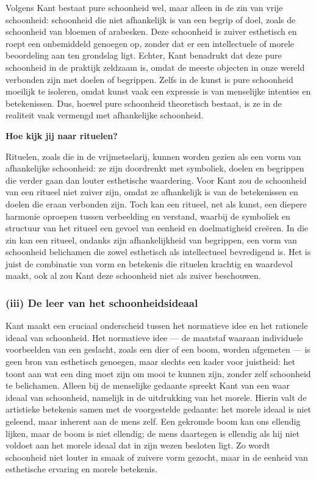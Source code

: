 \documentclass[11pt,twoside,openright]{memoir}
\begin{document}
Volgens Kant bestaat pure schoonheid wel, maar alleen in de zin van vrije schoonheid: schoonheid die niet afhankelijk is van een begrip of doel, zoals de schoonheid van bloemen of arabesken. Deze schoonheid is zuiver esthetisch en roept een onbemiddeld genoegen op, zonder dat er een intellectuele of morele beoordeling aan ten grondslag ligt. Echter, Kant benadrukt dat deze pure schoonheid in de praktijk zeldzaam is, omdat de meeste objecten in onze wereld verbonden zijn met doelen of begrippen. Zelfs in de kunst is pure schoonheid moeilijk te isoleren, omdat kunst vaak een expressie is van menselijke intenties en betekenissen. Dus, hoewel pure schoonheid theoretisch bestaat, is ze in de realiteit vaak vermengd met afhankelijke schoonheid.

\bigskip
\noindent
\textbf{Hoe kijk jij naar rituelen?}
\medskip

Rituelen, zoals die in de vrijmetselarij, kunnen worden gezien als een vorm van afhankelijke schoonheid: ze zijn doordrenkt met symboliek, doelen en begrippen die verder gaan dan louter esthetische waardering. Voor Kant zou de schoonheid van een ritueel niet zuiver zijn, omdat ze afhankelijk is van de betekenissen en doelen die eraan verbonden zijn. Toch kan een ritueel, net als kunst, een diepere harmonie oproepen tussen verbeelding en verstand, waarbij de symboliek en structuur van het ritueel een gevoel van eenheid en doelmatigheid creëren. In die zin kan een ritueel, ondanks zijn afhankelijkheid van begrippen, een vorm van schoonheid belichamen die zowel esthetisch als intellectueel bevredigend is. Het is juist de combinatie van vorm en betekenis die rituelen krachtig en waardevol maakt, ook al zou Kant deze schoonheid niet als zuiver beschouwen.

\subsubsection{(iii) De leer van het schoonheidsideaal}

Kant maakt een cruciaal onderscheid tussen het normatieve idee en het rationele ideaal van schoonheid. Het normatieve idee — de maatstaf waaraan individuele voorbeelden van een geslacht, zoals een dier of een boom, worden afgemeten — is geen bron van esthetisch genoegen, maar slechts een kader voor juistheid: het toont aan wat een ding moet zijn om mooi te kunnen zijn, zonder zelf schoonheid te belichamen. Alleen bij de menselijke gedaante spreekt Kant van een waar ideaal van schoonheid, namelijk in de uitdrukking van het morele. Hierin valt de artistieke betekenis samen met de voorgestelde gedaante: het morele ideaal is niet geleend, maar inherent aan de mens zelf. Een gekromde boom kan ons ellendig lijken, maar de boom is niet ellendig; de mens daartegen is ellendig als hij niet voldoet aan het morele ideaal dat in zijn wezen besloten ligt. Zo wordt schoonheid niet louter in smaak of zuivere vorm gezocht, maar in de eenheid van esthetische ervaring en morele betekenis.
\end{document}
